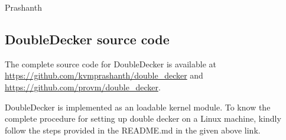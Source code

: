 \documentclass[11pt,a4paper]{report}
\newcommand{\dd}{DoubleDecker}
\begin{document}
    \vspace*{2em}
    \noindent Prashanth
    
    
  \tableofcontents
  \listoffigures
  \listoftables
  \cleardoublepage
  \setcounter{page}{1}
  \setlength{\parskip}{1em}
  
    
   
  
  
  
  
  
  
  
    
  
  \appendix
  \begin{appendices}
    \chapter{\dd{} source code}
      The complete source code for \dd{} is available at \url{https://github.com/kvmprashanth/double_decker} and
      \url{https://github.com/provm/double_decker}.
      
      \dd{} is implemented as an loadable kernel module. To know the complete procedure for setting up double decker on
      a Linux machine, kindly follow the steps provided in the README.md in the given above link.
    
  \end{appendices}
\end{document}
